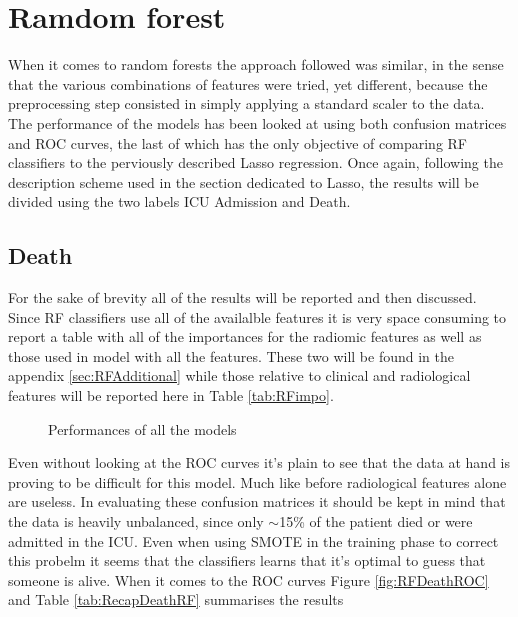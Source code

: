 \section{Ramdom forest}
When it comes to random forests the approach followed was similar, in the sense that the various combinations of features were tried, yet different, because the preprocessing step consisted in simply applying a standard scaler to the data. The performance of the models has been looked at using both confusion matrices and ROC curves, the last of which has the only objective of comparing RF classifiers to the perviously described Lasso regression. Once again, following the description scheme used in the section dedicated to Lasso, the results will be divided using the two labels ICU Admission and Death.

\subsection{Death}
For the sake of brevity all of the results will be reported and then discussed. Since RF classifiers use all of the availalble features it is very space consuming to report a table with all of the importances for the radiomic features as well as those used in model with all the features. These two will be found in the appendix \ref{sec:RFAdditional} while those relative to clinical and radiological features will be reported here in Table \ref{tab:RFimpo}.

\begin{figure}[H]
\centering
	\newline
        \caption{Performances of all the models}\label{fig:RFDeath}
\end{figure}

Even without looking at the ROC curves it's plain to see that the data at hand is proving to be difficult for this model. Much like before radiological features alone are useless. In evaluating these confusion matrices it should be kept in mind that the data is heavily unbalanced, since only $\sim$15\% of the patient died or were admitted in the ICU. Even when using SMOTE in the training phase to correct this probelm it seems that the classifiers learns that it's optimal to guess that someone is alive. When it comes to the ROC curves Figure \ref{fig:RFDeathROC} and Table \ref{tab:RecapDeathRF} summarises the results

